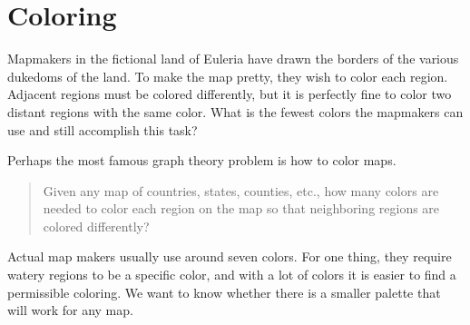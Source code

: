 \documentclass[12pt]{article}
\begin{document}
\section{Coloring}\label{sec:coloring}

\begin{activity}
Mapmakers in the fictional land of Euleria have drawn the borders of the various dukedoms of the land.  To make the map pretty, they wish to color each region.  Adjacent regions must be colored differently, but it is perfectly fine to color two distant regions with the same color.  What is the fewest colors the mapmakers can use and still accomplish this task?

\begin{center}
\end{center}

\end{activity}

Perhaps the most famous graph theory problem is how to color maps.

\begin{quote}
 Given any map of countries, states, counties, etc., how many colors are needed to color each region on the map so that neighboring regions are colored differently?
\end{quote}

Actual map makers usually use around seven colors.  For one thing, they require watery regions to be a specific color, and with a lot of colors it is easier to find a permissible coloring.  We want to know whether there is a smaller palette that will work for any map.
\end{document}
